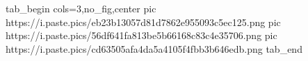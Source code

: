  
 
 
 
 

\ifcmt
  tab_begin cols=3,no_fig,center
     pic https://i.paste.pics/eb23b13057d81d7862e955093c5ec125.png
     pic https://i.paste.pics/56df641fa813be5b66168c83c4e35706.png
     pic https://i.paste.pics/cd63505afa4da5a4105f4fbb3b646edb.png
  tab_end
\fi
